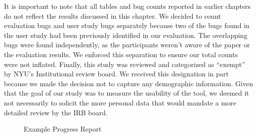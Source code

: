 It is important to note that all tables and bug counts reported in earlier
chapters do not reflect the results discussed in this chapter.
We decided to count evaluation bugs and user study bugs separately because two of the bugs found in the user study
had been previously identified
in our evaluation.
The overlapping bugs were found independently,
as the participants weren't aware of the paper or the evaluation results.
We enforced this separation to ensure our total counts were not inflated.
Finally, this study was reviewed and categorized as ``exempt'' by NYU's Institutional review board.
We received this designation in part because we made the decision not to capture any demographic information. Given that the goal of our study was to measure the usability of the tool, we deemed it not necessarily to solicit the more personal data that would mandate a more detailed review by the IRB board. 


\begin{figure}[btp]
\centering
{}
\caption[Example Progress Report]{Example Progress Report}
\label{fig:examplereport}
\end{figure}
\restoregeometry

